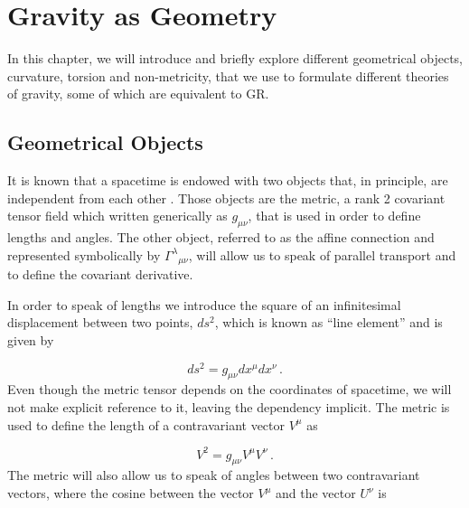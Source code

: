 \chapter{Gravity as Geometry}
\label{chap:gravity}

In this chapter, we will introduce and briefly explore different geometrical objects, curvature, torsion and non-metricity, that we use to formulate different theories of gravity, some of which are equivalent to \gls{GR}.


\section{Geometrical Objects}
\label{sec:geometrical-objects}

It is known that a spacetime is endowed with two objects that, in principle, are independent from each other \cite{Inverno}. Those objects are the metric, a rank 2 covariant tensor field which written generically as $g_{\mu \nu}$, that is used in order to define lengths and angles. The other object, referred to as the affine connection and represented symbolically by $\Gamma^\lambda{}_{\mu \nu}$, will allow us to speak of parallel transport and to define the covariant derivative.

In order to speak of lengths we introduce the square of an infinitesimal displacement between two points, $ds^2$, which is known as ``line element'' and is given by

\begin{equation}
    ds^2 = g_{\mu \nu} dx^\mu dx^\nu \,.
\end{equation}
Even though the metric tensor depends on the coordinates of spacetime, we will not make explicit reference to it, leaving the dependency implicit. The metric is used to define the length of a contravariant vector $V^\mu$ as

\begin{equation}
    V^2 = g_{\mu \nu} V^\mu V^\nu \,.
\end{equation}
The metric will also allow us to speak of angles between two contravariant vectors, where the cosine between the vector $V^\mu$ and the vector $U^\nu$ is

